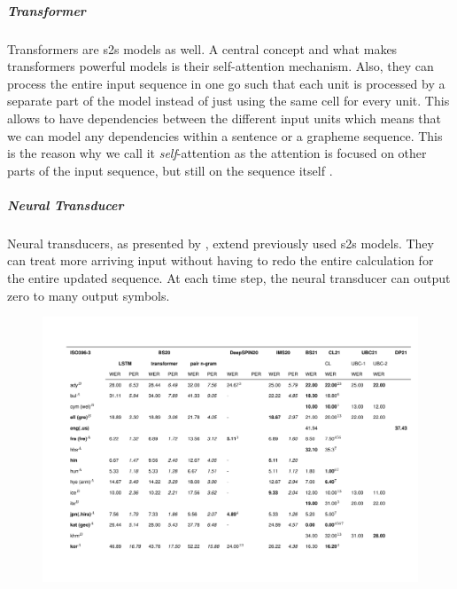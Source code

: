 \subparagraph{Transformer}
Transformers are \ac{s2s} models as well. A central concept and what makes transformers powerful models is their self-attention mechanism. Also, they can process the entire input sequence in one go such that each unit is processed by a separate part of the model instead of just using the same cell for every unit. This allows to have dependencies between the different input units which means that we can model any dependencies within a sentence or a grapheme sequence. This is the reason why we call it \textit{self}-attention as the attention is focused on other parts of the input sequence, but still on the sequence itself \citep{Alammar.03.01.2022}.

\subparagraph{Neural Transducer}
Neural transducers, as presented by \citet{jaitly2016neural}, extend previously used \ac{s2s} models. They can treat more arriving input without having to redo the entire calculation for the entire updated sequence. At each time step, the neural transducer can output zero to many output symbols. 


\begin{landscape}

\thispagestyle{empty}
\begin{figure}[h]
\vspace*{-2.8cm}
    \begin{center}
    \hspace*{-2cm}
      \includegraphics[page=1,width=1.1\linewidth]{SOTA.pdf}
    \end{center}
  \end{figure}
 \end{landscape}
 
